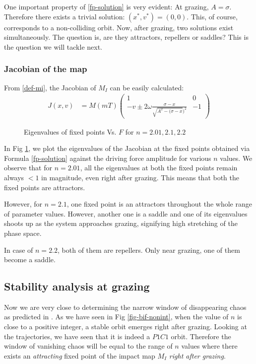 \documentclass{book}
\renewcommand{\(}{\begin{columns}}
\renewcommand{\)}{\end{columns}}
\newcommand{\<}[1]{\begin{column}{#1}}
\renewcommand{\>}{\end{column}}
\begin{document}
One important property of  \eqref{fp-solution} is very evident:
At grazing, $A=\sigma$.  Therefore there exists a trivial solution: 
$(x^*,v^*)=(0,0)$.  This, of course, corresponds to a non-colliding orbit.  
Now, after grazing, two solutions exist simultaneously.  The question is, 
are they attractors, repellers or saddles? This is the question we will tackle 
next.  


\subsubsection{Jacobian of the map}
From \eqref{def-mi}, the Jacobian of $M_I$ can be easily calculated:
\begin{align}
\label{eq-jac-mi}
J(x,v)&=M(mT)
\begin{pmatrix}
1 & 0\\
-v\pm2\omega \frac{\sigma-x}{\sqrt{A^2-(\sigma-x})^2} & -1
\end{pmatrix}
\end{align}

\begin{figure}[!htp]
\begin{center}
\caption{Eigenvalues of fixed points Vs.  $F$ for $n=2.01,2.1,2.2$}
\label{fig-eigs-F}
\def\svgwidth{\columnwidth}

\end{center}
\end{figure}


In Fig \ref{fig-eigs-F}, we plot the eigenvalues of the Jacobian at the fixed 
points obtained via Formula \eqref{fp-solution} against the driving force 
amplitude for various $n$ values.  We observe that for $n=2.01$, all the 
eigenvalues at both the fixed points remain always $<1$ in magnitude, even right after grazing.  This 
means that both the fixed points are attractors.  


However, for $n=2.1$, one fixed point is an attractors throughout the whole 
range of parameter values.  However, another one is a saddle and one of its 
eigenvalues shoots up as the system approaches grazing, signifying high 
stretching of the phase space.  


In case of $n=2.2$, both of them are repellers.  Only near grazing, one of 
them become a saddle.   

\subsection{Stability analysis at grazing}
Now we are very close to determining the narrow window of disappearing chaos 
as predicted in \cite{banerjee-kundu-soft}. As we have seen in Fig 
\ref{fig-bif-nonint}, when the value of $n$ is close to a positive integer, a 
stable orbit emerges right after grazing.  Looking at the trajectories, we 
have seen that it is indeed a $P1C1$ orbit.  Therefore the window of vanishing 
chaos will be equal to the range of $n$ values where there exists an 
\emph{attracting} fixed point of the impact map $M_I$ \emph{right after grazing}.
\end{document}
